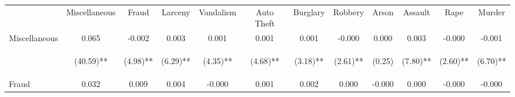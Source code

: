 \begin{tabular}{lccccccccccc}
\hline\hline \noalign{\smallskip} & Miscellaneous & Fraud & Larceny & Vandalism & Auto Theft & Burglary & Robbery & Arson & Assault & Rape & Murder\\
\noalign{\smallskip}\hline \noalign{\smallskip}Miscellaneous & 0.065 & -0.002 & 0.003 & 0.001 & 0.001 & 0.001 & -0.000 & 0.000 & 0.003 & -0.000 & -0.001\\
 & \begin{footnotesize}(40.59)**\end{footnotesize} & \begin{footnotesize}(4.98)**\end{footnotesize} & \begin{footnotesize}(6.29)**\end{footnotesize} & \begin{footnotesize}(4.35)**\end{footnotesize} & \begin{footnotesize}(4.68)**\end{footnotesize} & \begin{footnotesize}(3.18)**\end{footnotesize} & \begin{footnotesize}(2.61)**\end{footnotesize} & \begin{footnotesize}(0.25)\end{footnotesize} & \begin{footnotesize}(7.80)**\end{footnotesize} & \begin{footnotesize}(2.60)**\end{footnotesize} & \begin{footnotesize}(6.70)**\end{footnotesize}\\
\noalign{\smallskip}Fraud & 0.032 & 0.009 & 0.004 & -0.000 & 0.001 & 0.002 & 0.000 & -0.000 & 0.000 & -0.000 & -0.000\\

\end{tabular}
